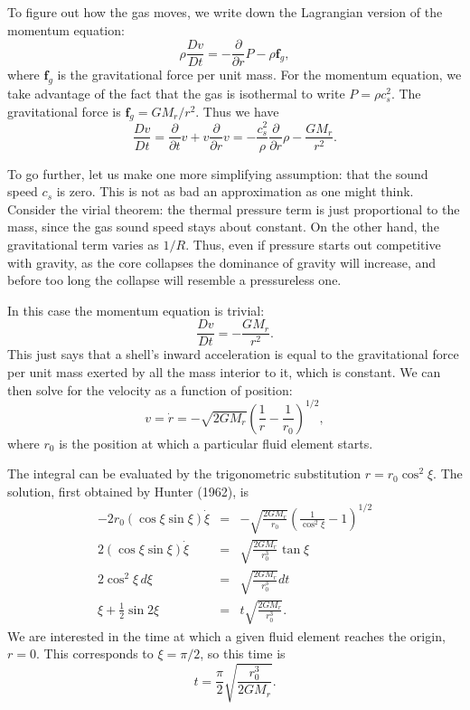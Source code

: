 To figure out how the gas moves, we write down the Lagrangian version of the momentum equation:
\begin{equation}
\rho \frac{Dv}{Dt} = -\frac{\partial}{\partial r}P - \rho \mathbf{f}_g,
\end{equation}
where $\mathbf{f}_g$ is the gravitational force per unit mass. For the momentum equation, we take advantage of the fact that the gas is isothermal to write $P=\rho c_s^2$. The gravitational force is $\mathbf{f}_g = G M_r / r^2$. Thus we have
\begin{equation}
\frac{Dv}{Dt}= \frac{\partial}{\partial t}v + v\frac{\partial}{\partial r} v= -\frac{c_s^2}{\rho} \frac{\partial}{\partial r}{\rho} - \frac{G M_r}{r^2}.
\end{equation}

To go further, let us make one more simplifying assumption: that the sound speed $c_s$ is zero. This is not as bad an approximation as one might think. Consider the virial theorem: the thermal pressure term is just proportional to the mass, since the gas sound speed stays about constant. On the other hand, the gravitational term varies as $1/R$. Thus, even if pressure starts out competitive with gravity, as the core collapses the dominance of gravity will increase, and before too long the collapse will resemble a pressureless one.

In this case the momentum equation is trivial:
\begin{equation}
\frac{Dv}{Dt} = -\frac{GM_r}{r^2}.
\end{equation}
This just says that a shell's inward acceleration is equal to the gravitational force per unit mass exerted by all the mass interior to it, which is constant. We can then solve for the velocity as a function of position:
\begin{equation}
v = \dot{r} = -\sqrt{2GM_r}\left(\frac{1}{r}-\frac{1}{r_0}\right)^{1/2},
\end{equation}
where $r_0$ is the position at which a particular fluid element starts. 

The integral can be evaluated by the trigonometric substitution $r=r_0 \cos^2\xi$. The solution, first obtained by Hunter (1962), is
\begin{eqnarray}
-2 r_0 (\cos\xi \sin\xi) \dot{\xi} & = & -\sqrt{\frac{2GM_r}{r_0}} \left(\frac{1}{\cos^2\xi}-1\right)^{1/2} \\
2 (\cos\xi\sin\xi) \dot{\xi} & = & \sqrt{\frac{2GM_r}{r_0^3}}\tan\xi \\
2 \cos^2\xi\, d\xi & = & \sqrt{\frac{2GM_r}{r_0^3}} dt \\
\xi+\frac{1}{2}\sin 2\xi & = & t \sqrt{\frac{2GM_r}{r_0^3}}.
\end{eqnarray}
We are interested in the time at which a given fluid element reaches the origin, $r=0$. This corresponds to $\xi = \pi/2$, so this time is
\begin{equation}
t = \frac{\pi}{2}\sqrt{\frac{r_0^3}{2 G M_r}}.
\end{equation}

